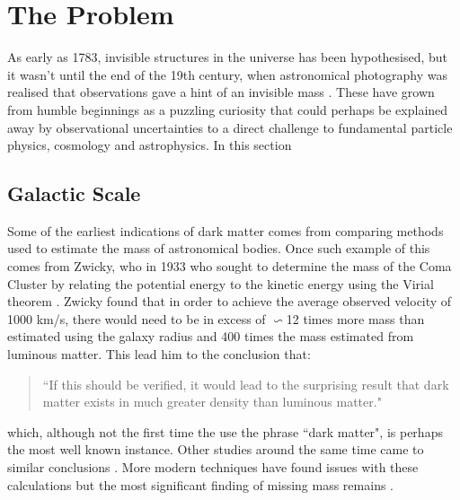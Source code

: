\section{The Problem}

\par
As early as 1783, invisible structures in the universe has been hypothesised, but it wasn't until the end of the 19th century, when astronomical photography was realised that observations gave a hint of an invisible mass \cite{History_Of_Dark_Matter_2018_ref}.
These have grown from humble beginnings as a puzzling curiosity that could perhaps be explained away by observational uncertainties to a direct challenge to fundamental particle physics, cosmology and astrophysics.
In this section 

%
%


\subsection{Galactic Scale}

\par
Some of the earliest indications of dark matter comes from comparing methods used to estimate the mass of astronomical bodies.
Once such example of this comes from Zwicky, who in 1933 who sought to determine the mass of the Coma Cluster by relating the potential energy to the kinetic energy using the Virial theorem \cite{Fritz_Zwicky_1933_ref}.
Zwicky found that in order to achieve the average observed velocity of 1000 km/s, there would need to be in excess of $\backsim$12 times more mass than estimated using the galaxy radius and 400 times the mass estimated from luminous matter.
This lead him to the conclusion that:
\begin{quote}
``If this should be verified, it would lead to the surprising result that dark matter
exists in much greater density than luminous matter."
\end{quote}
which, although not the first time the use the phrase ``dark matter", is perhaps the most well known instance.
Other studies around the same time came to similar conclusions \cite{hubble_and_co_viral_theorem_ref}.
More modern techniques have found issues with these calculations but the most significant finding of missing mass remains \cite{a_second_history_of_dark_matter_ref}.

